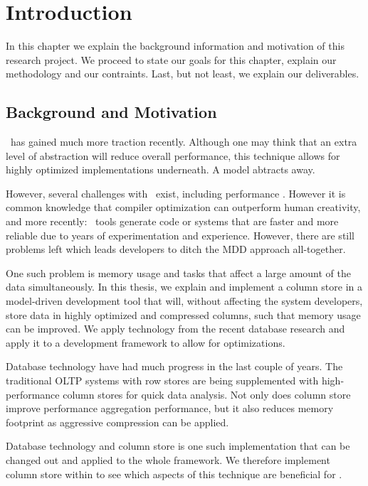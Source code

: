 \chapter{Introduction}
\label{chap:introduction}
In this chapter we explain the background information and motivation of this research project. We proceed to state our goals for this chapter, explain our methodology and our contraints. Last, but not least, we explain our deliverables.
\clearpage

\section{Background and Motivation}
\label{sec:Background and Motivation}
\mdd~has gained much more traction recently. Although one may think that an extra level of abstraction will reduce overall performance, this technique allows for highly optimized implementations underneath. A model abtracts away.

However, several challenges with \mdd~exist, including performance \cite{Selic2003-qa}. However it is common knowledge that compiler optimization can outperform human creativity, and more recently: \mdd~tools generate code or systems that are faster and more reliable due to years of experimentation and experience. However, there are still problems left which leads developers to ditch the MDD approach all-together.

One such problem is memory usage and tasks that affect a large amount of the data simultaneously. In this thesis, we explain and implement a column store in a model-driven development tool that will, without affecting the system developers, store data in highly optimized and compressed columns, such that memory usage can be improved. We apply technology from the recent database research and apply it to a development framework to allow for optimizations.

Database technology have had much progress in the last couple of years. The traditional OLTP systems with row stores are being supplemented with high-performance column stores for quick data analysis. Not only does column store improve performance aggregation performance, but it also reduces memory footprint as aggressive compression can be applied.


Database technology and column store is one such implementation that can be changed out and applied to the whole framework. We therefore implement column store within \gap to see which aspects of this technique are beneficial for \mdd.

